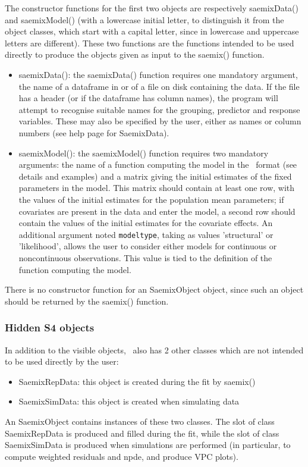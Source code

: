 The constructor functions for the first two objects are respectively {\sf saemixData()} and {\sf saemixModel()} (with a lowercase initial letter, to distinguish it from the object classes, which start with a capital letter, since in \R lowercase and uppercase letters are different). These two functions are the functions intended to be used directly to produce the objects given as input to the {\sf saemix()} function.
\begin{itemize}
\item {\sf saemixData()}: the {\sf saemixData()} function requires one mandatory argument, the name of a dataframe in \R or of a file on disk containing the data. If the file has a header (or if the dataframe has column names), the program will attempt to recognise suitable names for the grouping, predictor and response variables. These may also be specified by the user, either as names or column numbers (see help page for {\sf SaemixData}).
\item {\sf saemixModel()}: the {\sf saemixModel()} function requires two mandatory arguments: the name of a \R function computing the model in the \monolix~format (see details and examples) and a matrix giving the initial estimates of the fixed parameters in the model. This matrix should contain at least one row, with the values of the initial estimates for the population mean parameters; if covariates are present in the data and enter the model, a second row should contain  the values of the initial estimates for the covariate effects.
An additional argument noted \texttt{modeltype}, taking as values 'structural' or 'likelihood', allows the user to consider either models for continuous or noncontinuous observations. This value is tied to the definition of the \R function computing the model.
\end{itemize}
There is no constructor function for an {\sf SaemixObject} object, since such an object should be returned by the {\sf saemix()} function.

\subsubsection{Hidden S4 objects}

In addition to the visible objects, \monolix~also has 2 other classes which are not intended to be used directly by the user:
\begin{itemize}
\item {\sf SaemixRepData}: this object is created during the fit by {\sf saemix()}
\item {\sf SaemixSimData}: this object is created when simulating data
\end{itemize}
An {\sf SaemixObject} contains instances of these two classes. The slot of class {\sf SaemixRepData} is produced and filled during the fit, while the slot of class {\sf SaemixSimData} is produced when simulations are performed (in particular, to compute weighted residuals and npde, and produce VPC plots).

